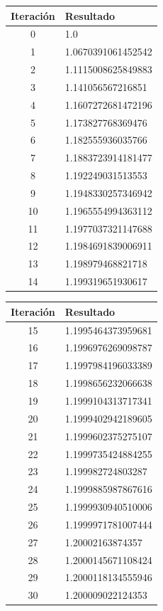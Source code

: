\documentclass[titlepage,a4paper]{article}
\begin{document}
\begin{multicols}{2}
\begin{center}
    \begin{tabular}{| c | l |}
    \hline
     Iteración & Resultado \\ \hline
         0     &  1.0 \\
    1     &  1.0670391061452542 \\
    2     &  1.1115008625849883 \\
    3     &  1.141056567216851 \\
    4     &  1.1607272681472196 \\
    5     &  1.173827768369476 \\
    6     &  1.182555936035766 \\
    7     &  1.1883723914181477 \\
    8     &  1.192249031513553 \\
    9     &  1.1948330257346942 \\
    10     &  1.1965554994363112 \\
    11     &  1.1977037321147688 \\
    12     &  1.1984691839006911 \\
    13     &  1.198979468821718 \\
    14     &  1.199319651930617 \\

          \hline
    \end{tabular}
\end{center}
        
    \begin{center}
    \begin{tabular}{| c | l |}
    \hline    
     Iteración & Resultado \\ \hline
       15     &  1.1995464373959681 \\
    16     &  1.1996976269098787 \\
    17     &  1.1997984196033389 \\
    18     &  1.1998656232066638 \\
    19     &  1.1999104313717341 \\
    20     &  1.1999402942189605 \\
    21     &  1.1999602375275107 \\
    22     &  1.1999735424884255 \\
    23     &  1.199982724803287 \\
    24     &  1.1999885987867616 \\
    25     &  1.1999930940510006 \\
    26     &  1.1999971781007444 \\
    27     &  1.20002163874357 \\
    28     &  1.2000145671108424 \\
    29     &  1.2000118134555946 \\
    30     &  1.200009022124353 \\
    \hline
    \end{tabular}
\end{center}
\end{multicols}
\end{document}
